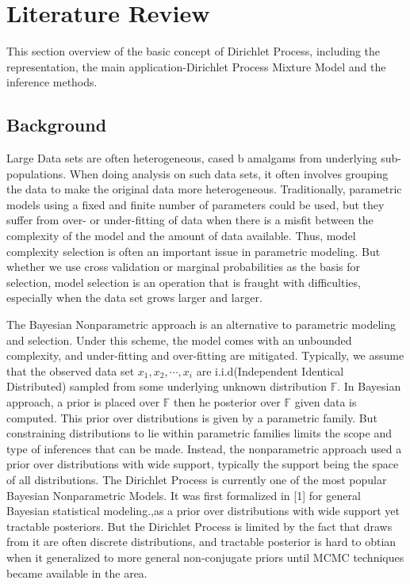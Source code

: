 \section{Literature Review}
This section overview of the basic concept of Dirichlet Process, including the representation, the main application-Dirichlet Process Mixture Model and the inference methods.  
\newcommand{\argmax}[1]{\underset{#1}{\operatorname{arg}\,\operatorname{max}}\;}
\newcommand{\argmin}[1]{\underset{#1}{\operatorname{arg}\,\operatorname{min}}\;}
\subsection{Background}
Large Data sets are often heterogeneous, cased b amalgams from underlying sub-populations. When doing analysis on such data sets, it often involves grouping the data to make the original data more heterogeneous. Traditionally, parametric models using a fixed and finite number of parameters could be used, but they suffer from over- or under-fitting of data when there is a misfit between the complexity of the model and the amount of data available. Thus, model complexity selection is often an important issue in parametric modeling. But whether we use cross validation or marginal probabilities as the basis for selection, model selection is an operation that is fraught with difficulties, especially when the data set grows larger and larger. 

The Bayesian Nonparametric approach is an alternative to parametric modeling and selection. Under this scheme, the model comes with an unbounded complexity, and under-fitting and over-fitting are mitigated. Typically, we assume that the observed data set $x_1,x_2,\cdots,x_i$ are i.i.d(Independent Identical Distributed) sampled from some underlying unknown distribution $\mathbb{F}$. In Bayesian approach,  a prior is placed over $\mathbb{F}$ then he posterior over  $\mathbb{F}$ given data is computed. This prior over distributions is given by a parametric family. But constraining distributions to lie within parametric families limits the scope and type of inferences that can be made. Instead, the nonparametric approach used a prior over distributions with wide support, typically the support being the space of all distributions.  The Dirichlet Process is currently one of the most popular Bayesian Nonparametric Models. It was first formalized in [1] for general Bayesian statistical modeling.,as a prior over distributions with wide support yet tractable posteriors. But the Dirichlet Process is limited by the fact that draws from it are often discrete distributions, and tractable posterior is hard to obtian when it generalized to more general non-conjugate priors until MCMC techniques became available in the area. 
